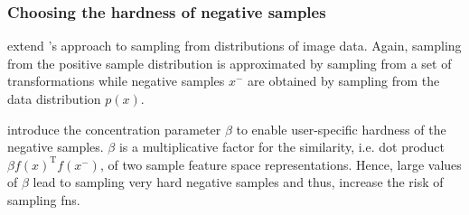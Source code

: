 \subsubsection{Choosing the hardness of negative samples}\label{subsec:choose_hardness}

\citet{robinson_contrastive_2021} 
extend \citet{chuang_debiased_2020}'s approach to sampling from distributions of image data.
Again, sampling from the positive sample distribution is approximated by sampling from a set of transformations
while negative samples $x^-$ are obtained by sampling from the data distribution $p(x)$.

\citet{robinson_contrastive_2021} introduce the concentration parameter $\beta$ 
to enable user-specific hardness of the negative samples.
$\beta$ is a multiplicative factor for the similarity, i.e. dot product $\beta f(x)^\text{T}f(x^-)$, of two sample feature space representations.
Hence, large values of $\beta$ lead to sampling very hard negative samples and thus, 
increase the risk of sampling \acp{fn}.